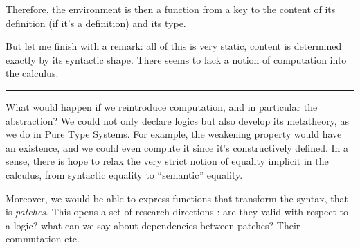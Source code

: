 \documentclass[12pt]{article}
\newcommand{\slide}{\vspace{1em} \hrule \vspace{1em}}
\begin{document}
Therefore, the environment is then a function from a key to the
content of its definition (if it's a definition) and its type.

But let me finish with a remark: all of this is very static, content
is determined exactly by its syntactic shape. There seems to lack a
notion of computation into the calculus.

\slide

What would happen if we reintroduce computation, and in particular the
abstraction? We could not only declare logics but also develop its
metatheory, as we do in Pure Type Systems. For example, the weakening
property would have an existence, and we could even compute it since
it's constructively defined. In a sense, there is hope to relax the
very strict notion of equality implicit in the calculus, from
syntactic equality to ``semantic'' equality.

Moreover, we would be able to express functions that transform the
syntax, that is \emph{patches}. This opens a set of research
directions : are they valid with respect to a logic? what can we say
about dependencies between patches? Their commutation etc.
\end{document}
